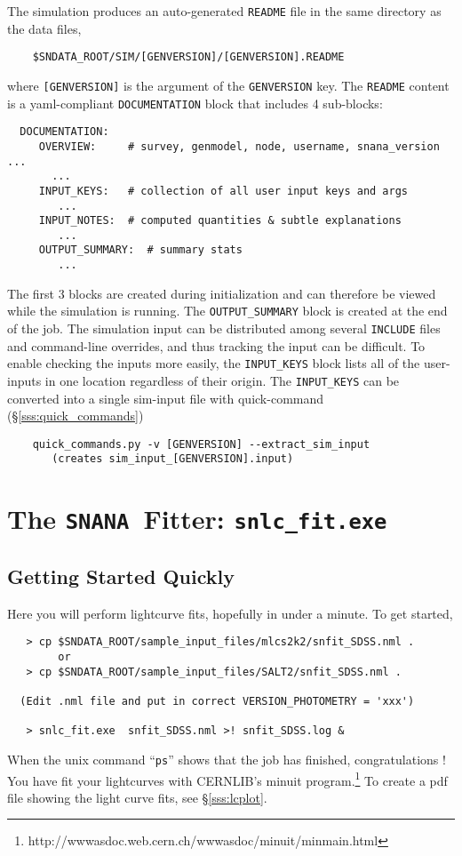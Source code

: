 \documentclass[12pt]{article}
\newcommand{\snfitter}{{\tt snlc\_fit.exe}}
\newcommand{\snana}{{\tt SNANA}}
\newcommand{\wwwMINUIT}{http://wwwasdoc.web.cern.ch/wwwasdoc/minuit/minmain.html}
\newcommand{\minuit}{{\sc minuit}}
\begin{document}
The simulation produces an auto-generated {\tt README} file in the
same directory as the data files,
\begin{verbatim}
    $SNDATA_ROOT/SIM/[GENVERSION]/[GENVERSION].README
\end{verbatim} 
where {\tt [GENVERSION]} is the argument of the {\tt GENVERSION} key.
The {\tt README} content is a yaml-compliant {\tt DOCUMENTATION} block
that includes 4 sub-blocks:
\begin{verbatim} 
  DOCUMENTATION:
     OVERVIEW:     # survey, genmodel, node, username, snana_version ...
       ...
     INPUT_KEYS:   # collection of all user input keys and args
        ...
     INPUT_NOTES:  # computed quantities & subtle explanations
        ...
     OUTPUT_SUMMARY:  # summary stats
        ...
\end{verbatim} 
The first 3 blocks are created during initialization and can therefore
be viewed while the simulation is running. The {\tt OUTPUT\_SUMMARY} block
is created at the end of the job.
The simulation input can be distributed among several {\tt INCLUDE} files
and command-line overrides, and thus tracking the input can be difficult.
To enable checking the inputs more easily, the {\tt INPUT\_KEYS} block 
lists all of the user-inputs in one location regardless of their origin.
The {\tt INPUT\_KEYS} can be converted into a single sim-input file
with quick-command (\S\ref{sss:quick_commands})
\begin{verbatim}
    quick_commands.py -v [GENVERSION] --extract_sim_input 
       (creates sim_input_[GENVERSION].input)
\end{verbatim}


   \clearpage
   \section{The \snana\ Fitter:  \snfitter\ }
   \label{sec:snlc_fit}


   \subsection{Getting Started Quickly }
   \label{subsec:fit_start}

Here you will perform lightcurve fits, 
hopefully in under a minute. To get started,
%
\begin{verbatim}
   > cp $SNDATA_ROOT/sample_input_files/mlcs2k2/snfit_SDSS.nml .
        or
   > cp $SNDATA_ROOT/sample_input_files/SALT2/snfit_SDSS.nml .

  (Edit .nml file and put in correct VERSION_PHOTOMETRY = 'xxx')

   > snlc_fit.exe  snfit_SDSS.nml >! snfit_SDSS.log &
\end{verbatim}
%
When the unix command ``{\tt ps}'' shows that
the job has finished, congratulations !
You have fit your lightcurves with 
CERNLIB's {\minuit} program.\footnote{\wwwMINUIT}
To create a pdf file showing the light curve fits,
see \S\ref{sss:lcplot}.
\end{document}
